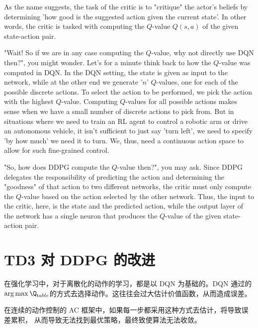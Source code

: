 As the name suggests, the task of the critic is to "critique" the actor's beliefs 
by determining 'how good is the suggested action given the current state'. In other 
words, the critic is tasked with computing the $Q$-value $Q(s,a)$ of the given 
state-action pair.

"Wait! So if we are in any case computing the $Q$-value, why not directly use DQN 
then?", you might wonder. Let's for a minute think back to how the $Q$-value was 
computed in DQN. In the DQN setting, the state is given as input to the network, 
while at the other end we generate '$n$' $Q$-values, one for each of the possible 
discrete actions. To select the action to be performed, we pick the action with 
the highest $Q$-value. Computing $Q$-values for all possible actions makes sense 
when we have a small number of discrete actions to pick from. But in situations 
where we need to train an RL agent to control a robotic arm or drive an autonomous 
vehicle, it isn't sufficient to just say 'turn left', we need to specify 'by how 
much' we need it to turn. We, thus, need a continuous action space to allow for 
such fine-grained control.

"So, how does DDPG compute the $Q$-value then?", you may ask. Since DDPG delegates 
the responsibility of predicting the action and determining the "goodness" of that 
action to two different networks, the critic must only compute the $Q$-value based 
on the action selected by the other network. Thus, the input to the critic, here, 
is the state and the predicted action, while the output layer of the network has a 
single neuron that produces the $Q$-value of the given state-action pair.


\section{TD3 对 DDPG 的改进}

在强化学习中，对于离散化的动作的学习，都是以 DQN 为基础的。DQN 通过的
$\arg\max\Q_{\text table}$的方式去选择动作。这往往会过大估计价值函数，从而造成误差。

在连续的动作控制的 AC 框架中，如果每一步都采用这种方式去估计，将导致误差累积，
从而导致无法找到最优策略，最终致使算法无法收敛。

